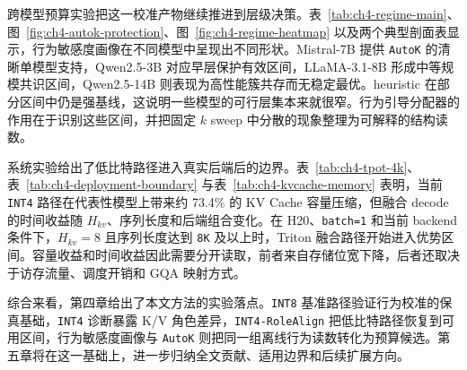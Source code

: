 跨模型预算实验把这一校准产物继续推进到层级决策。表~\ref{tab:ch4-regime-main}、图~\ref{fig:ch4-autok-protection}、图~\ref{fig:ch4-regime-heatmap} 以及两个典型剖面表显示，行为敏感度画像在不同模型中呈现出不同形状。Mistral-7B 提供 \texttt{AutoK} 的清晰单模型支持，Qwen2.5-3B 对应早层保护有效区间，LLaMA-3.1-8B 形成中等规模共识区间，Qwen2.5-14B 则表现为高性能簇共存而无稳定最优。heuristic 在部分区间中仍是强基线，这说明一些模型的可行层集本来就很窄。行为引导分配器的作用在于识别这些区间，并把固定 $k$ sweep 中分散的现象整理为可解释的结构读数。

系统实验给出了低比特路径进入真实后端后的边界。表~\ref{tab:ch4-tpot-4k}、表~\ref{tab:ch4-deployment-boundary} 与表~\ref{tab:ch4-kvcache-memory} 表明，当前 \texttt{INT4} 路径在代表性模型上带来约 73.4\% 的 KV Cache 容量压缩，但融合 decode 的时间收益随 $H_{kv}$、序列长度和后端组合变化。在 H20、\texttt{batch=1} 和当前 backend 条件下，$H_{kv}=8$ 且序列长度达到 \texttt{8K} 及以上时，Triton 融合路径开始进入优势区间。容量收益和时间收益因此需要分开读取，前者来自存储位宽下降，后者还取决于访存流量、调度开销和 GQA 映射方式。

综合来看，第四章给出了本文方法的实验落点。\texttt{INT8} 基准路径验证行为校准的保真基础，\texttt{INT4} 诊断暴露 K/V 角色差异，\texttt{INT4-RoleAlign} 把低比特路径恢复到可用区间，行为敏感度画像与 \texttt{AutoK} 则把同一组离线行为读数转化为预算候选。第五章将在这一基础上，进一步归纳全文贡献、适用边界和后续扩展方向。
